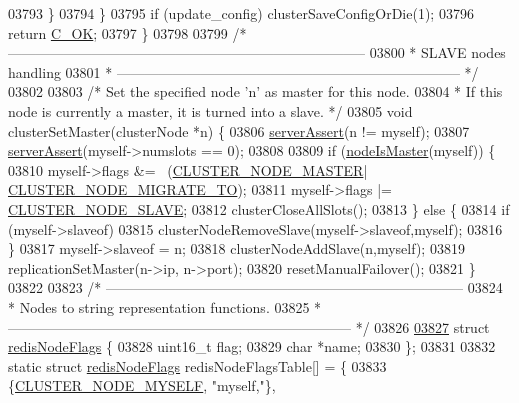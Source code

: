 \begin{DoxyCode}
{{{{{{{{{{{{{{{{{{{{{{{{{{{{{{{{{{{{{{{{{{{{{{{{{{{{{{{{{{{{{{{{03793         \}
03794     \}
03795     \textcolor{keywordflow}{if} (update\_config) clusterSaveConfigOrDie(1);
03796     \textcolor{keywordflow}{return} \hyperlink{server_8h_a303769ef1065076e68731584e758d3e1}{C\_OK};
03797 \}
03798 
03799 \textcolor{comment}{/* -----------------------------------------------------------------------------}
03800 \textcolor{comment}{ * SLAVE nodes handling}
03801 \textcolor{comment}{ * -------------------------------------------------------------------------- */}
03802 
03803 \textcolor{comment}{/* Set the specified node 'n' as master for this node.}
03804 \textcolor{comment}{ * If this node is currently a master, it is turned into a slave. */}
03805 \textcolor{keywordtype}{void} clusterSetMaster(clusterNode *n) \{
03806     \hyperlink{server_8h_a88114b5169b4c382df6b56506285e56a}{serverAssert}(n != myself);
03807     \hyperlink{server_8h_a88114b5169b4c382df6b56506285e56a}{serverAssert}(myself->numslots == 0);
03808 
03809     \textcolor{keywordflow}{if} (\hyperlink{cluster_8h_a2d8e84269474d8750565fb3fb67aa436}{nodeIsMaster}(myself)) \{
03810         myself->flags &= ~(\hyperlink{cluster_8h_a5dcea846e31b55b73244aa2e496a31bf}{CLUSTER\_NODE\_MASTER}|
      \hyperlink{cluster_8h_a1d5a62356ed9f5986613c2315a358119}{CLUSTER\_NODE\_MIGRATE\_TO});
03811         myself->flags |= \hyperlink{cluster_8h_a34b7bfd1f810397be68c3b5d13d4d134}{CLUSTER\_NODE\_SLAVE};
03812         clusterCloseAllSlots();
03813     \} \textcolor{keywordflow}{else} \{
03814         \textcolor{keywordflow}{if} (myself->slaveof)
03815             clusterNodeRemoveSlave(myself->slaveof,myself);
03816     \}
03817     myself->slaveof = n;
03818     clusterNodeAddSlave(n,myself);
03819     replicationSetMaster(n->ip, n->port);
03820     resetManualFailover();
03821 \}
03822 
03823 \textcolor{comment}{/* -----------------------------------------------------------------------------}
03824 \textcolor{comment}{ * Nodes to string representation functions.}
03825 \textcolor{comment}{ * -------------------------------------------------------------------------- */}
03826 
\hyperlink{structredisNodeFlags}{03827} \textcolor{keyword}{struct} \hyperlink{structredisNodeFlags}{redisNodeFlags} \{
03828     uint16\_t flag;
03829     \textcolor{keywordtype}{char} *name;
03830 \};
03831 
03832 \textcolor{keyword}{static} \textcolor{keyword}{struct} \hyperlink{structredisNodeFlags}{redisNodeFlags} redisNodeFlagsTable[] = \{
03833     \{\hyperlink{cluster_8h_afee946c4e74c08465e9b4ead5e3659e6}{CLUSTER\_NODE\_MYSELF},       \textcolor{stringliteral}{"myself,"}\},
}}}}}}}}}}}}}}}}}}}}}}}}}}}}}}}}}}}}}}}}}}}}}}}}}}}}}}}}}}}}}}}}
\end{DoxyCode}
